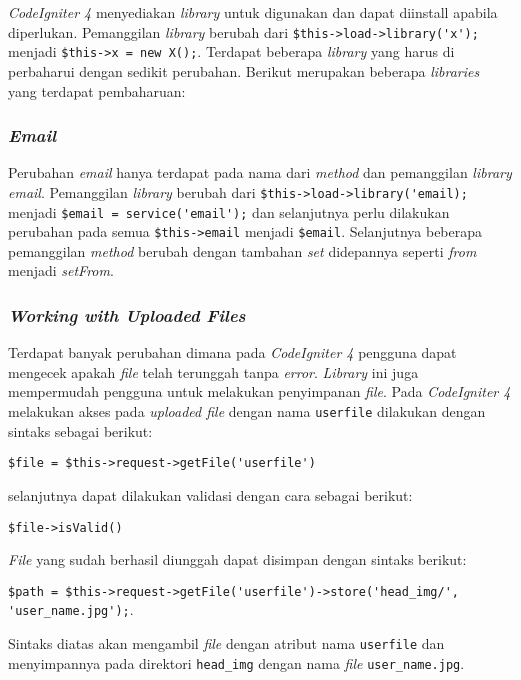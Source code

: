 \textit{CodeIgniter 4} menyediakan \textit{library} untuk digunakan dan dapat diinstall apabila diperlukan. Pemanggilan \textit{library} berubah dari \verb|$this->load->library('x');| menjadi \verb|$this->x = new X();|. Terdapat beberapa \textit{library} yang harus di perbaharui dengan sedikit perubahan. Berikut merupakan beberapa \textit{libraries} yang terdapat pembaharuan:

\subsubsection{\textit{Email}}

Perubahan \textit{email} hanya terdapat pada nama dari \textit{method} dan pemanggilan \textit{library email}. Pemanggilan  \textit{library} berubah dari \verb|$this->load->library('email);| menjadi \verb|$email = service('email');| dan selanjutnya perlu dilakukan perubahan pada semua \verb|$this->email| menjadi \verb|$email|. Selanjutnya beberapa pemanggilan \textit{method} berubah dengan tambahan \textit{set} didepannya seperti \textit{from} menjadi \textit{setFrom}.

\subsubsection{\textit{Working with Uploaded Files}}

Terdapat banyak perubahan dimana pada \textit{CodeIgniter 4} pengguna dapat mengecek apakah \textit{file} telah terunggah tanpa \textit{error}. \textit{Library} ini juga mempermudah pengguna untuk melakukan penyimpanan \textit{file}. Pada \textit{CodeIgniter 4} melakukan akses pada \textit{uploaded file} dengan nama \texttt{userfile} dilakukan dengan sintaks sebagai berikut:
\begin{center}
\verb|$file = $this->request->getFile('userfile')|
\end{center} selanjutnya dapat dilakukan validasi dengan cara sebagai berikut:
\begin{center}
\verb|$file->isValid()|
\end{center} 
\textit{File} yang sudah berhasil diunggah dapat disimpan dengan sintaks berikut:
\begin{center}
\verb|$path = $this->request->getFile('userfile')->store('head_img/', 'user_name.jpg');|.
\end{center} 

Sintaks diatas akan mengambil \textit{file} dengan atribut nama \texttt{userfile} dan menyimpannya pada direktori \texttt{head\_img} dengan nama \textit{file} \texttt{user\_name.jpg}.

